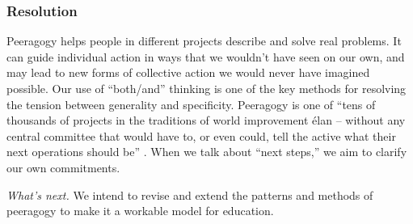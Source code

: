 

\subsubsection*{Resolution}
Peeragogy helps people in different projects describe and solve real problems.  It can guide individual action in ways that we wouldn't have seen on our own, and may lead to new forms of collective action we would never have imagined possible.
%
Our use of ``both/and'' thinking is one of the key methods for resolving the tension between generality and specificity.
Peeragogy is one of ``tens of thousands of projects in the traditions of world improvement \'elan -- without any central committee that would have to, or even could, tell the active what their next operations should be'' \cite[p. 402]{sloterdijk2013change}.  When we talk about ``next steps,'' we aim to clarify our own commitments.

\begin{framed}
\noindent \emph{What's next.} We intend to revise and extend the patterns and methods of peeragogy to make it a workable model for education.
\end{framed}

